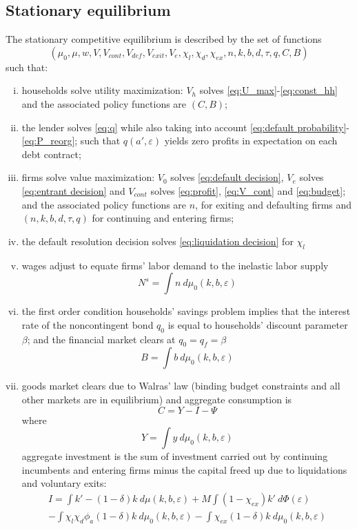 \documentclass[12pt]{article}
\begin{document}
\subsection{Stationary equilibrium}\label{sec:eq}
The stationary competitive equilibrium is described by the set of functions
$$(\mu_0, \mu, w, V, V_{cont}, V_{def}, V_{exit}, V_e, \chi_l, \chi_d, \chi_{ex}, n,k,b,d,\tau,q, C, B)$$
such that: 
\begin{enumerate}[(i)]
\item households solve utility maximization: $V_h$ solves \ref{eq:U_max}-\ref{eq:const_hh} and the associated policy functions are $(C, B)$;
\item the lender solves \ref{eq:q} while also taking into account \ref{eq:default probability}-\ref{eq:P_reorg}; such that $q(a',\varepsilon)$ yields zero profits in expectation on each debt contract;
\item firms solve value maximization: $V_0$ solves \ref{eq:default decision}, $V_e$ solves \ref{eq:entrant decision} and $V_{cont}$ solves \ref{eq:profit}, \ref{eq:V_cont} and \ref{eq:budget}; and the associated policy functions are $n$, for exiting and defaulting firms and $(n,k,b,d,\tau,q)$ for continuing and entering firms;
\item the default resolution decision solves \ref{eq:liquidation decision}  for $\chi_l$
\item wages adjust to equate firms' labor demand to the inelastic labor supply
$$ N^s = \int n  \ d \mu_0 (k,b,\varepsilon)  $$
\item the first order condition households' savings problem implies that the interest rate of the noncontingent bond $q_0$ is equal to households' discount parameter $\beta$; and the financial market clears at $q_0 = q_f = \beta$
 $$ B = \int b \ d \mu_0 (k,b,\varepsilon) $$
\item goods market clears due to Walras' law (binding budget constraints and all other markets are in equilibrium) and aggregate consumption is
 $$ C = Y - I - \Psi$$
where
 $$ Y =  \int y \ d \mu_0 (k,b,\varepsilon) $$
aggregate investment is the sum of investment carried out by continuing incumbents and entering firms minus the capital freed up due to liquidations and voluntary exits:
\begin{multline*} 
    I = \int   k' -(1-\delta)k \ d \mu (k,b,\varepsilon) + M \int (1-\chi_{ex}) k' \ d \Phi(\varepsilon)    \\
   -  \int   \chi_l \chi_d \phi_a (1-\delta)k \ d \mu_0 (k,b,\varepsilon) - \int \chi_{ex} (1-\delta) k \ d \mu_0 (k,b,\varepsilon)   

\end{multline*}
\end{enumerate}
\end{document}
